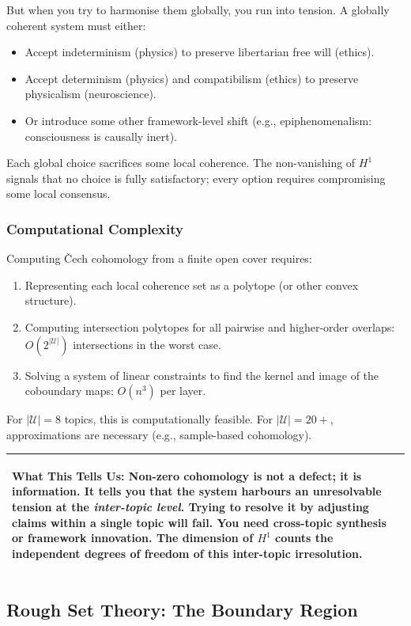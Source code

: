 \documentclass[11pt,letterpaper]{article}
\theoremstyle{definition}
\theoremstyle{remark}
\newenvironment{insightbox}{%
  \vspace{0.3cm}%
  \noindent\begin{tabular}{|p{\dimexpr\textwidth-4\tabcolsep-2\arrayrulewidth}|}
  \hline
  \small\itshape\color{accent}
}{%
  \\ \hline
  \end{tabular}
  \vspace{0.3cm}
}
\begin{document}
But when you try to harmonise them globally, you run into tension. A globally coherent system must either:
\begin{itemize}
\item Accept indeterminism (physics) to preserve libertarian free will (ethics).
\item Accept determinism (physics) and compatibilism (ethics) to preserve physicalism (neuroscience).
\item Or introduce some other framework-level shift (e.g., epiphenomenalism: consciousness is causally inert).
\end{itemize}

Each global choice sacrifices some local coherence. The non-vanishing of $H^1$ signals that no choice is fully satisfactory; every option requires compromising some local consensus.

\subsubsection*{Computational Complexity}

Computing Čech cohomology from a finite open cover requires:
\begin{enumerate}
\item Representing each local coherence set as a polytope (or other convex structure).
\item Computing intersection polytopes for all pairwise and higher-order overlaps: $O(2^{|\mathcal{U}|})$ intersections in the worst case.
\item Solving a system of linear constraints to find the kernel and image of the coboundary maps: $O(n^3)$ per layer.
\end{enumerate}

For $|\mathcal{U}| = 8$ topics, this is computationally feasible. For $|\mathcal{U}| = 20+$, approximations are necessary (e.g., sample-based cohomology).

\begin{insightbox}
\textbf{What This Tells Us:} Non-zero cohomology is not a defect; it is information. It tells you that the system harbours an unresolvable tension at the \emph{inter-topic level}. Trying to resolve it by adjusting claims within a single topic will fail. You need cross-topic synthesis or framework innovation. The dimension of $H^1$ counts the independent degrees of freedom of this inter-topic irresolution.
\end{insightbox}

\subsection{Rough Set Theory: The Boundary Region}
\end{document}
